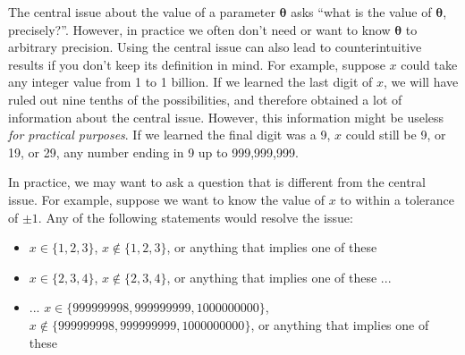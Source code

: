 \documentclass[entropy,article,submit,oneauthor,pdftex,10pt,a4paper]{mdpi}
\newcommand{\x}{\boldsymbol{\theta}}
\begin{document}
The central issue about the value of a parameter $\x$ asks
``what is the value of $\x$, precisely?''. However, in practice we often
don't need or want to know $\x$ to arbitrary precision. Using the central
issue can also lead to counterintuitive results if you don't keep its
definition in mind. For example, suppose $x$ could take any integer value
from 1 to 1 billion. If we learned the last digit of $x$, we
will have ruled out nine tenths of the possibilities, and therefore obtained
a lot of information about the central issue. However,
this information might be useless {\em for practical purposes}.
If we learned the final
digit was a 9, $x$ could still be 9, or 19, or 29, any number ending in 9
up to 999,999,999.

In practice, we may
want to ask a question that is different from the central issue.
For example, suppose we want to know the value of $x$ to within a tolerance
of $\pm 1$. Any of the following statements would resolve the issue:
\begin{itemize}
\item $x \in \{1, 2, 3\}$, $x \notin \{1, 2, 3\}$,
                or anything that implies one of these
\item $x \in \{2, 3, 4\}$, $x \notin \{2, 3, 4\}$,
                or anything that implies one of these ...
\item ... $x \in \{999999998, 999999999, 1000000000\}$,
            $x \notin \{999999998, 999999999, 1000000000\}$,
                or anything that implies one of these
\end{itemize}




%

\end{document}

